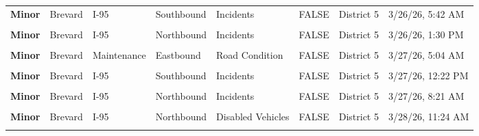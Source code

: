 \documentclass[
]{article}
\begin{document}
\begin{longtable}[t]{>{\raggedright\arraybackslash}p{1.5cm}>{\raggedright\arraybackslash}p{2.5cm}>{\raggedright\arraybackslash}p{3cm}>{\raggedright\arraybackslash}p{1.8cm}>{\raggedright\arraybackslash}p{2.5cm}lll}
\textbf{Minor} & Brevard & I-95 & Southbound & Incidents & FALSE & District 5 & 3/26/26, 5:42 AM\\
\textbf{\cellcolor{gray!10}{Minor}} & \cellcolor{gray!10}{Brevard} & \cellcolor{gray!10}{I-95} & \cellcolor{gray!10}{Northbound} & \cellcolor{gray!10}{Incidents} & \cellcolor{gray!10}{FALSE} & \cellcolor{gray!10}{District 5} & \cellcolor{gray!10}{3/26/26, 6:18 AM}\\
\addlinespace
\textbf{Minor} & Brevard & I-95 & Northbound & Incidents & FALSE & District 5 & 3/26/26, 1:30 PM\\
\textbf{\cellcolor{gray!10}{Minor}} & \cellcolor{gray!10}{Brevard} & \cellcolor{gray!10}{I-95} & \cellcolor{gray!10}{Southbound} & \cellcolor{gray!10}{Incidents} & \cellcolor{gray!10}{FALSE} & \cellcolor{gray!10}{District 5} & \cellcolor{gray!10}{3/26/26, 1:40 PM}\\
\textbf{Minor} & Brevard & Maintenance & Eastbound & Road Condition & FALSE & District 5 & 3/27/26, 5:04 AM\\
\textbf{\cellcolor{gray!10}{Minor}} & \cellcolor{gray!10}{Brevard} & \cellcolor{gray!10}{I-95} & \cellcolor{gray!10}{Southbound} & \cellcolor{gray!10}{Incidents} & \cellcolor{gray!10}{FALSE} & \cellcolor{gray!10}{District 5} & \cellcolor{gray!10}{3/27/26, 6:38 AM}\\
\textbf{Minor} & Brevard & I-95 & Southbound & Incidents & FALSE & District 5 & 3/27/26, 12:22 PM\\
\addlinespace
\textbf{\cellcolor{gray!10}{Minor}} & \cellcolor{gray!10}{Brevard} & \cellcolor{gray!10}{I-95} & \cellcolor{gray!10}{Northbound} & \cellcolor{gray!10}{Disabled Vehicles} & \cellcolor{gray!10}{FALSE} & \cellcolor{gray!10}{District 5} & \cellcolor{gray!10}{3/27/26, 7:32 AM}\\
\textbf{Minor} & Brevard & I-95 & Northbound & Incidents & FALSE & District 5 & 3/27/26, 8:21 AM\\
\textbf{\cellcolor{gray!10}{Minor}} & \cellcolor{gray!10}{Brevard} & \cellcolor{gray!10}{I-95} & \cellcolor{gray!10}{Northbound} & \cellcolor{gray!10}{Construction Zones} & \cellcolor{gray!10}{FALSE} & \cellcolor{gray!10}{District 5} & \cellcolor{gray!10}{3/27/26, 1:53 PM}\\
\textbf{Minor} & Brevard & I-95 & Northbound & Disabled Vehicles & FALSE & District 5 & 3/28/26, 11:24 AM\\
\textbf{\cellcolor{gray!10}{Minor}} & \cellcolor{gray!10}{Brevard} & \cellcolor{gray!10}{I-95} & \cellcolor{gray!10}{Southbound} & \cellcolor{gray!10}{Disabled Vehicles} & \cellcolor{gray!10}{FALSE} & \cellcolor{gray!10}{District 5} & \cellcolor{gray!10}{3/28/26, 11:40 AM}\\

\end{longtable}
\end{document}
